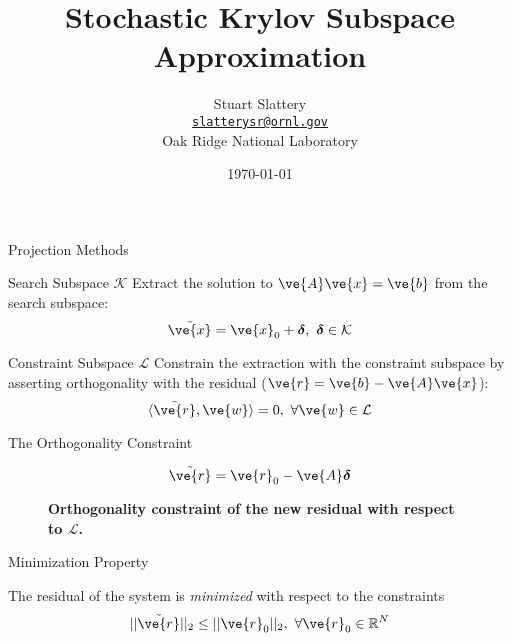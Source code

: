 \documentclass{beamer}
\author[Stuart Slattery]{Stuart Slattery\\
  \bigskip
  \href{mailto:slatterysr@ornl.gov}{\texttt{slatterysr@ornl.gov}} \\
  \bigskip
  Oak Ridge National Laboratory}
\date{\today}
\title[Krylov Monte Carlo \hspace{1mm}
  \insertframenumber/\inserttotalframenumber]{Stochastic Krylov
  Subspace Approximation}
\begin{document}
\maketitle

\begin{frame}{Projection Methods}

  \medskip \medskip
  \begin{beamerboxesrounded}[upper=boxheadcolor,lower=boxbodycolor,shadow=true]
    {Search Subspace $\mathcal{K}$} Extract the solution to
    $\ve{A}\ve{x}=\ve{b}$ from the search subspace:
    \[
    \tilde{\ve{x}} = \ve{x}_0 +
    \boldsymbol{\delta},\ \boldsymbol{\delta} \in \mathcal{K}
    \]
  \end{beamerboxesrounded}

  \medskip \medskip
  \begin{beamerboxesrounded}[upper=boxheadcolor,lower=boxbodycolor,shadow=true]
    {Constraint Subspace $\mathcal{L}$} Constrain the extraction with
    the constraint subspace by asserting orthogonality with the
    residual ($\ve{r} = \ve{b}-\ve{A}\ve{x}$):
    \[
    \langle \tilde{\ve{r}},\ve{w} \rangle = 0,\ \forall \ve{w} \in
    \mathcal{L}
    \]  
  \end{beamerboxesrounded}

\end{frame}

\begin{frame}{The Orthogonality Constraint}

  \[
  \tilde{\ve{r}} = \ve{r}_0 - \ve{A}\boldsymbol{\delta}
  \]

  \begin{figure}[htpb!]
    \begin{center}
      \scalebox{1.1}{  }
    \end{center}
    \caption{\textbf{Orthogonality constraint of the new residual with
        respect to $\mathcal{L}$.}}
  \end{figure}

  \begin{beamerboxesrounded}[upper=boxheadcolor,lower=boxbodycolor,shadow=true]
    {Minimization Property}

    The residual of the system is \textit{minimized} with respect to
    the constraints
    \[
    ||\tilde{\ve{r}}||_2 \leq ||\ve{r}_0||_2,\ \forall \ve{r}_0 \in
    \mathbb{R}^N
    \]
  \end{beamerboxesrounded}

\end{frame}
\end{document}
